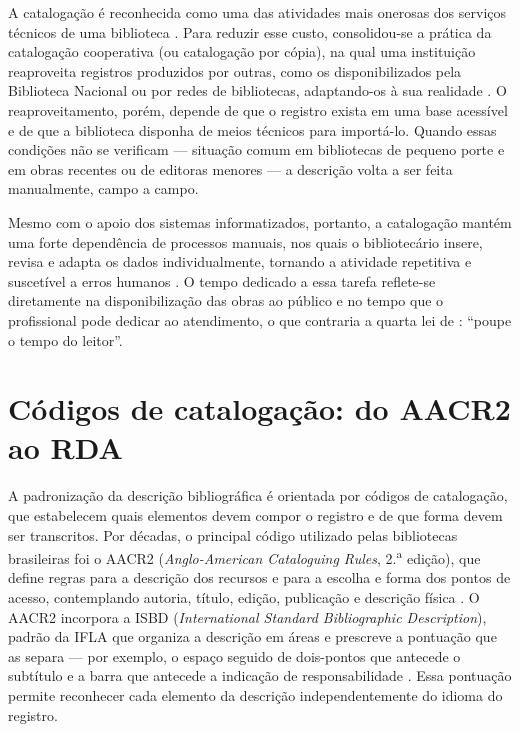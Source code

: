 A catalogação é reconhecida como uma das atividades mais onerosas dos serviços técnicos de uma biblioteca \cite{tauber1954}. Para reduzir esse custo, consolidou-se a prática da catalogação cooperativa (ou catalogação por cópia), na qual uma instituição reaproveita registros produzidos por outras, como os disponibilizados pela Biblioteca Nacional ou por redes de bibliotecas, adaptando-os à sua realidade \cite{mey2009}. O reaproveitamento, porém, depende de que o registro exista em uma base acessível e de que a biblioteca disponha de meios técnicos para importá-lo. Quando essas condições não se verificam --- situação comum em bibliotecas de pequeno porte e em obras recentes ou de editoras menores --- a descrição volta a ser feita manualmente, campo a campo.

Mesmo com o apoio dos sistemas informatizados, portanto, a catalogação mantém uma forte dependência de processos manuais, nos quais o bibliotecário insere, revisa e adapta os dados individualmente, tornando a atividade repetitiva e suscetível a erros humanos \cite{mey2009}. O tempo dedicado a essa tarefa reflete-se diretamente na disponibilização das obras ao público e no tempo que o profissional pode dedicar ao atendimento, o que contraria a quarta lei de : ``poupe o tempo do leitor''.

\section{Códigos de catalogação: do AACR2 ao RDA}
\label{sec:codigos}

A padronização da descrição bibliográfica é orientada por códigos de catalogação, que estabelecem quais elementos devem compor o registro e de que forma devem ser transcritos. Por décadas, o principal código utilizado pelas bibliotecas brasileiras foi o AACR2 (\textit{Anglo-American Cataloguing Rules}, 2.\textsuperscript{a} edição), que define regras para a descrição dos recursos e para a escolha e forma dos pontos de acesso, contemplando autoria, título, edição, publicação e descrição física \cite{jsc2005}. O AACR2 incorpora a ISBD (\textit{International Standard Bibliographic Description}), padrão da IFLA que organiza a descrição em áreas e prescreve a pontuação que as separa --- por exemplo, o espaço seguido de dois-pontos que antecede o subtítulo e a barra que antecede a indicação de responsabilidade \cite{isbd2011}. Essa pontuação permite reconhecer cada elemento da descrição independentemente do idioma do registro.


